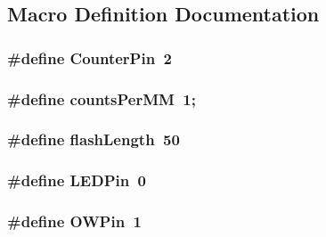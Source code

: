 \subsection{Macro Definition Documentation}
\hypertarget{OWRain1_8ino_abc1e3c6ffa5733cf9f5f428b3d724765}{
\subsubsection[{Counter\-Pin}]{\setlength{\rightskip}{0pt plus 5cm}\#define Counter\-Pin~2}}\label{OWRain1_8ino_abc1e3c6ffa5733cf9f5f428b3d724765}
\hypertarget{OWRain1_8ino_a8f0a461ec2c621e04db91f4970f2f1d5}{
\subsubsection[{counts\-Per\-M\-M}]{\setlength{\rightskip}{0pt plus 5cm}\#define counts\-Per\-M\-M~1;}}\label{OWRain1_8ino_a8f0a461ec2c621e04db91f4970f2f1d5}
\hypertarget{OWRain1_8ino_a65b6f41e12d2d8bdbd3416c8db11770e}{
\subsubsection[{flash\-Length}]{\setlength{\rightskip}{0pt plus 5cm}\#define flash\-Length~50}}\label{OWRain1_8ino_a65b6f41e12d2d8bdbd3416c8db11770e}
\hypertarget{OWRain1_8ino_abd966e26c1237652c6c1dc46a8f14203}{
\subsubsection[{L\-E\-D\-Pin}]{\setlength{\rightskip}{0pt plus 5cm}\#define L\-E\-D\-Pin~0}}\label{OWRain1_8ino_abd966e26c1237652c6c1dc46a8f14203}
\hypertarget{OWRain1_8ino_a7f5aa1ac0711ae18877a165a9bf24625}{
\subsubsection[{O\-W\-Pin}]{\setlength{\rightskip}{0pt plus 5cm}\#define O\-W\-Pin~1}}\label{OWRain1_8ino_a7f5aa1ac0711ae18877a165a9bf24625}


